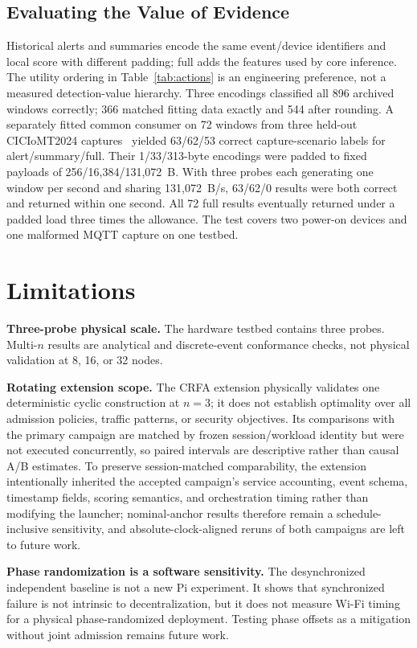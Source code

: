 \documentclass[10pt,journal]{IEEEtran}
\newcommand{\CRFA}{\textsc{CRFA}}
\begin{document}
\subsection{Evaluating the Value of Evidence}
Historical alerts and summaries encode the same event/device identifiers and
local score with different padding; full adds the features used by core
inference. The utility ordering in Table~\ref{tab:actions} is an engineering
preference, not a measured detection-value hierarchy. Three encodings
classified all 896 archived windows correctly; 366 matched fitting data
exactly and 544 after rounding.
A separately fitted common consumer on 72 windows from three held-out
CICIoMT2024 captures~\cite{dadkhah2024iomt} yielded 63/62/53 correct
capture-scenario labels for alert/summary/full. Their 1/33/313-byte encodings
were padded to fixed payloads of 256/16,384/131,072~B. With three probes each
generating one window per second and sharing 131,072~B/s, 63/62/0 results
were both correct and returned within one second. All 72 full results
eventually returned under a padded load three times the allowance. The test
covers two power-on devices and one malformed MQTT capture on one testbed.

\section{Limitations}
\label{sec:limitations}

\textbf{Three-probe physical scale.}
The hardware testbed contains three probes. Multi-$n$ results are analytical
and discrete-event conformance checks, not physical validation at 8, 16, or
32 nodes.

\textbf{Rotating extension scope.}
The \CRFA{} extension physically validates one deterministic cyclic
construction at $n=3$; it does not establish optimality over all admission
policies, traffic patterns, or security objectives. Its comparisons with the
primary campaign are matched by frozen session/workload identity but were not
executed concurrently, so paired intervals are descriptive rather than causal
A/B estimates. To preserve session-matched comparability, the extension intentionally
inherited the accepted campaign's service accounting, event schema, timestamp
fields, scoring semantics, and orchestration timing rather than modifying the
launcher; nominal-anchor results therefore remain a schedule-inclusive
sensitivity, and absolute-clock-aligned reruns of both campaigns are left to
future work.

\textbf{Phase randomization is a software sensitivity.}
The desynchronized independent baseline is not a new Pi experiment. It shows
that synchronized failure is not intrinsic to decentralization, but it does
not measure Wi-Fi timing for a physical phase-randomized deployment. Testing
phase offsets as a mitigation without joint admission remains future work.
\end{document}
